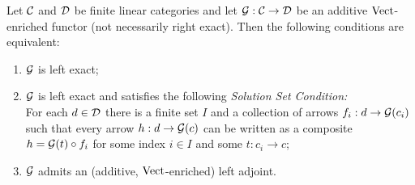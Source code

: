 \documentclass{amsart}
\begin{document}
\begin{proposition}
	Let $\mathcal C$ and $\mathcal D$ be finite linear categories and let $\mathcal G: \mathcal C \rightarrow \mathcal D$  be an additive $\mathrm{Vect}$-enriched functor (not necessarily right exact). Then the following conditions are equivalent:
	\begin{enumerate}
		\item $\mathcal G$ is left exact;  
		\item $\mathcal G$ is left exact and satisfies the following {\em Solution Set Condition:} \\  For each $d \in \mathcal D$ there is a finite set $I$ and a collection of arrows $f_i:d \to \mathcal G(c_i)$ such that every arrow $h:d \to \mathcal G(c)$ can be written as a composite $h = \mathcal G(t) \circ f_i$ for some index $i \in I$ and some $t: c_i \to c$; 
		\item $\mathcal G$ admits an (additive, ${\mathrm{Vect}}$-enriched) left adjoint.
	\end{enumerate}
\end{proposition}
\end{document}
